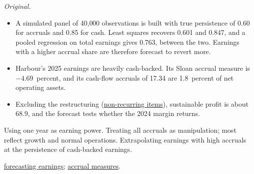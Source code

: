 \begin{qfmethod}
 \emph{Original.}
\begin{itemize}
\item A simulated panel of 40{,}000 observations is built with true persistence of 0.60 for accruals and 0.85 for cash. Least squares recovers 0.601 and 0.847, and a pooled regression on total earnings gives 0.763, between the two. Earnings with a higher accrual share are therefore forecast to revert more.
\item Harbour's 2025 earnings are heavily cash-backed. Its Sloan accrual measure is $-4.69$~percent, and its cash-flow accruals of 17.34 are 1.8~percent of net operating assets.
\item Excluding the restructuring (\hyperref[meth:non-recurring-items]{non-recurring items}), sustainable profit is about 68.9, and the forecast tests whether the 2024 margin returns.
\end{itemize}

 Using one year as earning power. Treating all accruals as manipulation; most reflect growth and normal operations. Extrapolating earnings with high accruals at the persistence of cash-backed earnings.

 \hyperref[meth:ratio-based-earnings-forecast]{forecasting earnings}; \hyperref[meth:reporting-warning-signs]{accrual measures}.

\end{qfmethod}

